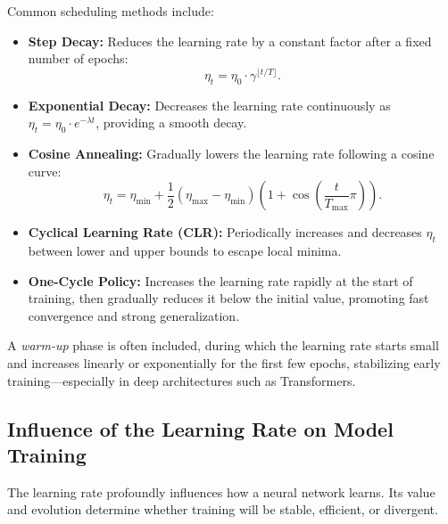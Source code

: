 \documentclass[12pt,a4paper]{report}
\begin{document}
Common scheduling methods include:
\begin{itemize}
    \item \textbf{Step Decay:} Reduces the learning rate by a constant factor after a fixed number of epochs:
    \[
    \eta_t = \eta_0 \cdot \gamma^{\lfloor t / T \rfloor}.
    \]
    \item \textbf{Exponential Decay:} Decreases the learning rate continuously as
    $\eta_t = \eta_0 \cdot e^{-\lambda t}$, providing a smooth decay.
    \item \textbf{Cosine Annealing:} Gradually lowers the learning rate following a cosine curve:
    \[
    \eta_t = \eta_{\min} + \frac{1}{2}(\eta_{\max} - \eta_{\min})\left(1 + \cos\left(\frac{t}{T_{\max}}\pi\right)\right).
    \]
    \item \textbf{Cyclical Learning Rate (CLR):} Periodically increases and decreases $\eta_t$ between lower and upper bounds to escape local minima.
    \item \textbf{One-Cycle Policy:} Increases the learning rate rapidly at the start of training, then gradually reduces it below the initial value, promoting fast convergence and strong generalization.
\end{itemize}

A \textit{warm-up} phase is often included, during which the learning rate starts small and increases linearly or exponentially for the first few epochs, stabilizing early training—especially in deep architectures such as Transformers.

\vspace{1em}
\subsection{Influence of the Learning Rate on Model Training}

The learning rate profoundly influences how a neural network learns.  
Its value and evolution determine whether training will be stable, efficient, or divergent.
\end{document}

